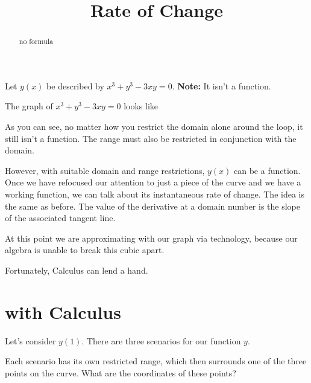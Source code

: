 \documentclass{ximera}
\title{Rate of Change}
\begin{document}
\begin{abstract}
no formula
\end{abstract}
\maketitle




Let $y(x)$ be described by $x^3 + y^3 - 3 x y = 0$. \textbf{Note: } It isn't a function.



The graph of $x^3 + y^3 - 3 x y = 0$ looks like




\begin{center}
\end{center}


As you can see, no matter how you restrict the domain alone around the loop, it still isn't a function. The range must also be restricted in conjunction with the domain.

However, with suitable domain and range restrictions, $y(x)$ can be a function. \\


Once we have refocused our attention to just a piece of the curve and we have a working function, we can talk about its instantaneous rate of change.  The idea is the same as before.  The value of the derivative at a domain number is the slope of the associated tangent line.


At this point we are approximating with our graph via technology, because our algebra is unable to break this cubic apart.



Fortunately, Calculus can lend a hand.




\section*{with Calculus}

Let's consider $y(1)$.  There are three scenarios for our function $y$.


\begin{center}
\end{center}

Each scenario has its own restricted range, which then surrounds one of the three points on the curve. What are the coordinates of these points?
\end{document}
